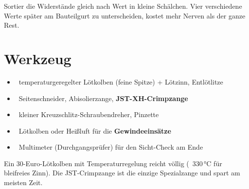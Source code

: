 \begin{schmunzel}
Sortier die Widerstände gleich nach Wert in kleine Schälchen. Vier verschiedene Werte
später am Bauteilgurt zu unterscheiden, kostet mehr Nerven als der ganze Rest.
\end{schmunzel}

\clearpage
\section{Werkzeug}
\begin{itemize}[leftmargin=8mm,itemsep=2pt]
  \item \faBolt\ temperaturgeregelter Lötkolben (feine Spitze) + Lötzinn, Entlötlitze
  \item \faCut\ Seitenschneider, Abisolierzange, \textbf{JST-XH-Crimpzange}
  \item \faScrewdriver\ kleiner Kreuzschlitz-Schraubendreher, Pinzette
  \item \faFire\ Lötkolben oder Heißluft für die \textbf{Gewindeeinsätze}
  \item \faSearch\ Multimeter (Durchgangsprüfer) für den Sicht-Check am Ende
\end{itemize}
\begin{tipp}
Ein 30-Euro-Lötkolben mit Temperaturregelung reicht völlig (~330\,°C für bleifreies Zinn).
Die JST-Crimpzange ist die einzige Spezialzange und spart am meisten Zeit.
\end{tipp}

\clearpage
